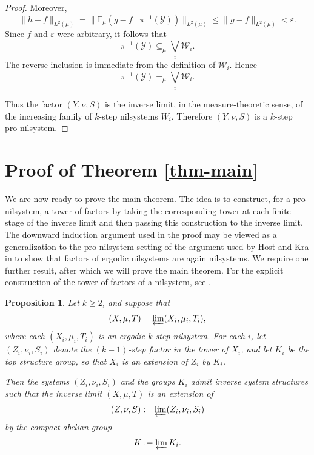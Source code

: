 \documentclass[12pt]{amsart}
\theoremstyle{plain}
\newtheorem{proposition}[theorem]{Proposition}
\theoremstyle{definition}
\newcommand\E{\mathbb{E}}
\newcommand\eps{\varepsilon}
\begin{document}
\begin{proof}
    Moreover,
    \[
    \|h-f\|_{L^2(\mu)}
    =\|\E_\mu(g-f\mid \pi^{-1}(\mathcal Y))\|_{L^2(\mu)}
    \leq \|g-f\|_{L^2(\mu)}
    <\eps.
    \]
    Since $f$ and $\eps$ were arbitrary, it follows that
    \[
    \pi^{-1}(\mathcal Y)\subseteq_\mu \bigvee_i \mathcal W_i.
    \]
    The reverse inclusion is immediate from the definition of $\mathcal W_i$.
    Hence
    \[
    \pi^{-1}(\mathcal Y)=_\mu \bigvee_i \mathcal W_i.
    \]

    Thus the factor $(Y,\nu,S)$ is the inverse limit, in the measure-theoretic sense, of the increasing family of $k$-step nilsystems $W_i$.
    Therefore $(Y,\nu,S)$ is a $k$-step pro-nilsystem.
\end{proof}

\section{Proof of Theorem \ref{thm-main}}\label{Sec:proof} 

We are now ready to prove the main theorem.
The idea is to construct, for a pro-nilsystem, a tower of factors by taking the corresponding tower at each finite stage of the inverse limit and then passing this construction to the inverse limit.
The downward induction argument used in the proof may be viewed as a generalization to the pro-nilsystem setting of the argument used by Host and Kra in \cite[Chapter~13, Theorem~11]{hk-book} to show that factors of ergodic nilsystems are again nilsystems. 
We require one further result, after which we will prove the main theorem.
For the explicit construction of the tower of factors of a nilsystem, see \cite[Chapter~11, Section~1]{hk-book}.

\begin{proposition}\label{prop:inverse_limit_extension}
    Let $k \geq 2$, and suppose that
    \[
    (X,\mu,T)=\varprojlim (X_i,\mu_i,T_i),
    \]
    where each $(X_i,\mu_i,T_i)$ is an ergodic $k$-step nilsystem.
    For each $i$, let $(Z_i,\nu_i,S_i)$ denote the $(k-1)$-step factor in the tower of $X_i$, and let $K_i$ be the top structure group, so that $X_i$ is an extension of $Z_i$ by $K_i$.

    Then the systems $(Z_i,\nu_i,S_i)$ and the groups $K_i$ admit inverse system structures such that the inverse limit $(X,\mu,T)$ is an extension of
    \[
    (Z,\nu,S):=\varprojlim (Z_i,\nu_i,S_i)
    \]
    by the compact abelian group
    \[
    K:=\varprojlim K_i.
    \]
\end{proposition}
\end{document}
